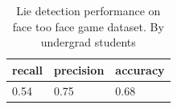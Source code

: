 \begin{table}[tbph]
	\centering
	\begin{tabular}{|c|c|l|}
		\hline
		 \multicolumn{1}{|l|}{recall}    & \multicolumn{1}{l|}{precision}  & \multicolumn{1}{l|}{accuracy}  \\ \hline
		 \multicolumn{1}{|l|}{0.54} 		& \multicolumn{1}{l|}{0.75} & \multicolumn{1}{l|}{0.68} \\ \hline
                                                            
	\end{tabular}
	\caption{Lie detection performance on face too face game dataset. By undergrad students}
	\label{Table:undergradsres_pref}
\end{table}



